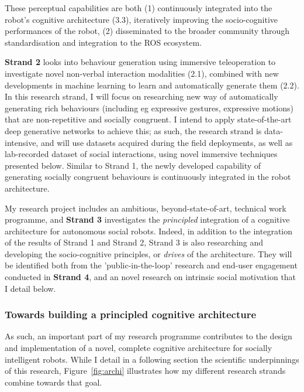 These perceptual capabilities are both (1) continuously integrated into the
robot's cognitive architecture (3.3), iteratively improving the socio-cognitive
performances of the robot, (2) disseminated to the broader community through
standardisation and integration to the ROS ecosystem.

\textbf{Strand 2} looks into behaviour generation using immersive teleoperation
to investigate novel non-verbal interaction modalities (2.1), combined with
new developments in machine learning to learn and automatically generate them
(2.2). In this research strand, I will focus on researching new way of
automatically generating rich behaviours (including eg expressive gestures,
expressive motions) that are non-repetitive and socially congruent. I intend to
apply state-of-the-art deep generative networks to achieve this; as such, the
research strand is data-intensive, and will use datasets acquired during the
field deployments, as well as lab-recorded dataset of social interactions, using
novel immersive techniques presented below. Similar to Strand 1, the newly
developed capability of generating socially congruent behaviours is continuously
integrated in the robot architecture.


My research project includes an ambitious, beyond-state-of-art, technical work
programme, and \textbf{Strand 3} investigates the \emph{principled} integration
of a cognitive architecture for autonomous social robots.  Indeed, in addition
to the integration of the results of Strand 1 and Strand 2, Strand 3 is also
researching and developing the socio-cognitive principles, or \emph{drives} of
the architecture. They will be identified both from the 'public-in-the-loop'
research and end-user engagement conducted in \textbf{Strand 4}, and an novel
research on intrinsic social motivation that I detail below.

\subsubsection{Towards building a principled cognitive architecture}

As such, an important part of my research programme contributes to the design
and implementation of a novel, complete cognitive architecture for socially
intelligent robots. While I detail in a following section the scientific
underpinnings of this research, Figure~\ref{fig:archi} illustrates how my
different research strands combine towards that goal.

